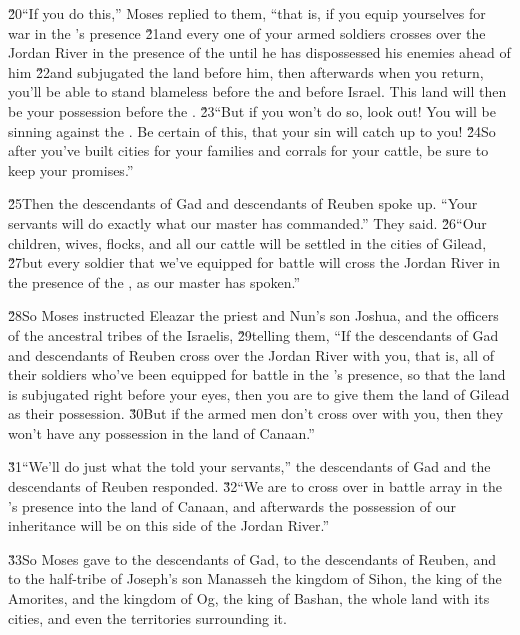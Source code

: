 \v{20}``If you do this,'' Moses replied to them, ``that is, if you equip yourselves for war in the 's presence \v{21}and every one of your armed soldiers crosses over the Jordan River in the presence of the  until he has dispossessed his enemies ahead of him \v{22}and subjugated the land before him, then afterwards when you return, you'll be able to stand blameless before the  and before Israel. This land will then be your possession before the . \v{23}``But if you won't do so, look out! You will be sinning against the . Be certain of this, that your sin will catch up to you! \v{24}So after you've built cities for your families and corrals for your cattle, be sure to keep your promises.''

\v{25}Then the descendants of Gad and descendants of Reuben spoke up. ``Your servants will do exactly what our master has commanded.'' They said. \v{26}``Our children, wives, flocks, and all our cattle will be settled in the cities of Gilead, \v{27}but every soldier that we've equipped for battle will cross the Jordan River in the presence of the , as our master has spoken.''

\v{28}So Moses instructed Eleazar the priest and Nun's son Joshua, and the officers of the ancestral tribes of the Israelis, \v{29}telling them, ``If the descendants of Gad and descendants of Reuben cross over the Jordan River with you, that is, all of their soldiers who've been equipped for battle in the 's presence, so that the land is subjugated right before your eyes, then you are to give them the land of Gilead as their possession. \v{30}But if the armed men don't cross over with you, then they won't have any possession in the land of Canaan.''

\v{31}``We'll do just what the  told your servants,'' the descendants of Gad and the descendants of Reuben responded. \v{32}``We are to cross over in battle array in the 's presence into the land of Canaan, and afterwards the possession of our inheritance will be on this side of the Jordan River.''

\v{33}So Moses gave to the descendants of Gad, to the descendants of Reuben, and to the half-tribe of Joseph's son Manasseh the kingdom of Sihon, the king of the Amorites, and the kingdom of Og, the king of Bashan, the whole land with its cities, and even the territories surrounding it.

